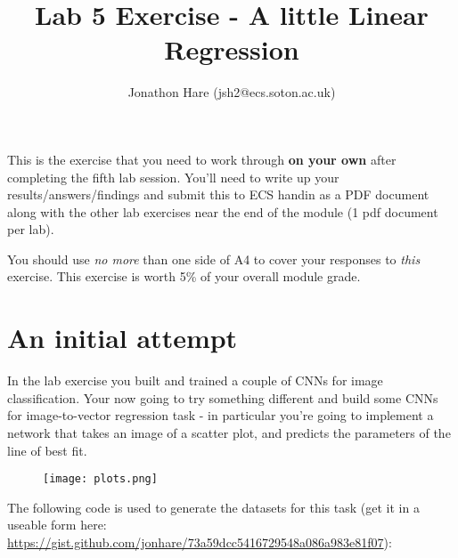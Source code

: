 \documentclass[a4paper]{article}
\begin{document}
\lstset{language=Python,upquote=true}

\setlength{\leftskip}{20pt}
\title{Lab 5 Exercise - A little Linear Regression}
\author{Jonathon Hare (jsh2@ecs.soton.ac.uk)}

\maketitle


This is the exercise that you need to work through \textbf{on your own} after completing the fifth lab session. You'll need to write up your results/answers/findings and submit this to ECS handin as a PDF document along with the other lab exercises near the end of the module (1 pdf document per lab). 

You should use \emph{no more} than one side of A4 to cover your responses to \emph{this} exercise. This exercise is worth 5\% of your overall module grade.

\section{An initial attempt}\label{init}

In the lab exercise you built and trained a couple of CNNs for image classification. Your now going to try something different and build some CNNs for image-to-vector regression task - in particular you're going to implement a network that takes an image of a scatter plot, and predicts the parameters of the line of best fit.

\begin{figure}[h!]
\center
	\texttt{[image: plots.png]}
\end{figure}

The following code is used to generate the datasets for this task (get it in a useable form here: \url{https://gist.github.com/jonhare/73a59dcc5416729548a086a983e81f07}):
\end{document}
